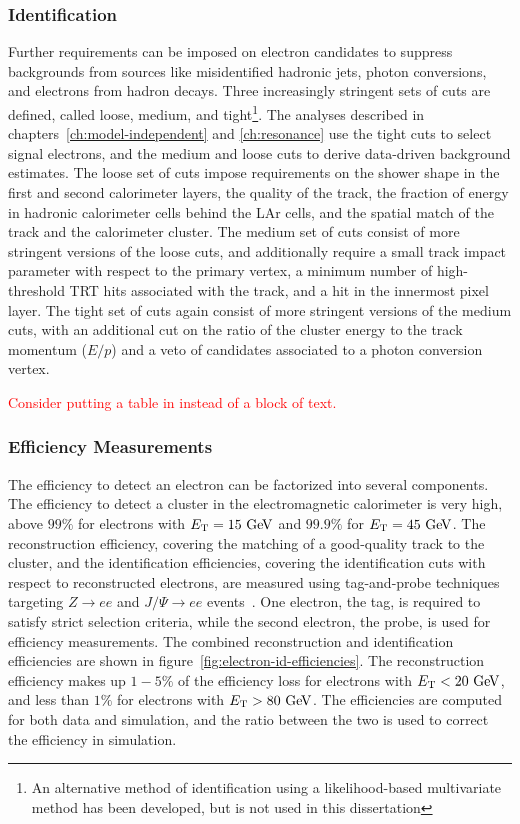 \subsubsection{Identification}
Further requirements can be imposed on electron candidates to suppress backgrounds from sources like misidentified hadronic jets, photon conversions, and electrons from hadron decays. Three increasingly stringent sets of cuts are defined, called loose, medium, and tight\footnote{An alternative method of identification using a likelihood-based multivariate method has been developed, but is not used in this dissertation}. The analyses described in chapters~\ref{ch:model-independent} and \ref{ch:resonance} use the tight cuts to select signal electrons, and the medium and loose cuts to derive data-driven background estimates. The loose set of cuts impose requirements on the shower shape in the first and second calorimeter layers, the quality of the track, the fraction of energy in hadronic calorimeter cells behind the LAr cells, and the spatial match of the track and the calorimeter cluster. The medium set of cuts consist of more stringent versions of the loose cuts, and additionally require a small track impact parameter with respect to the primary vertex, a minimum number of high-threshold TRT hits associated with the track, and a hit in the innermost pixel layer. The tight set of cuts again consist of more stringent versions of the medium cuts, with an additional cut on the ratio of the cluster energy to the track momentum ($E/p$) and a veto of candidates associated to a photon conversion vertex. 

\textcolor{red}{Consider putting a table in instead of a block of text.}

\subsubsection{Efficiency Measurements}\label{sec:reco-electron-efficiency}
The efficiency to detect an electron can be factorized into several components. The efficiency to detect a cluster in the electromagnetic calorimeter is very high, above $99\%$ for electrons with $\Et=15 \GeV$ and $99.9\%$ for $\Et=45 \GeV$. The reconstruction efficiency, covering the matching of a good-quality track to the cluster, and the identification efficiencies, covering the identification cuts with respect to reconstructed electrons, are measured using tag-and-probe techniques targeting $Z\rightarrow ee$ and $J/\Psi\rightarrow ee$ events~\cite{TheATLASCollaboration:2014vz}. One electron, the tag, is required to satisfy strict selection criteria, while the second electron, the probe, is used for efficiency measurements. The combined reconstruction and identification efficiencies are shown in figure~\ref{fig:electron-id-efficiencies}. The reconstruction efficiency makes up $1-5\%$ of the efficiency loss for electrons with $\Et<20 \GeV$, and less than $1\%$ for electrons with $\Et>80 \GeV$. The efficiencies are computed for both data and simulation, and the ratio between the two is used to correct the efficiency in simulation.

